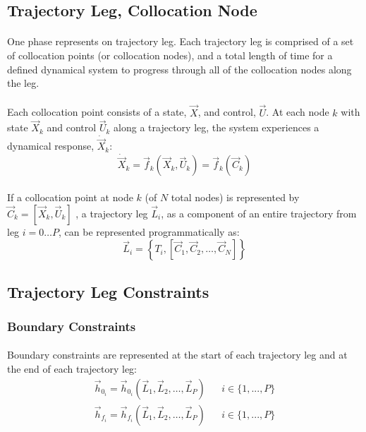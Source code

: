 \subsection{Trajectory Leg, Collocation Node}
\paragraph{}
One phase represents on trajectory leg. Each trajectory leg is comprised of a set of collocation points (or collocation nodes), and a total length of time for a defined dynamical system to progress through all of the collocation nodes along the leg. 
\paragraph{}
Each collocation point consists of a state, $\vec{X}$, and control, $\vec{U}$. At each node $k$ with state $\vec{X}_k$ and control $\vec{U}_k$ along a trajectory leg, the system experiences a dynamical response, $\dot{\vec{X}}_k$:
\begin{equation}
\dot{\vec{X}}_k = \vec{f}_k (\vec{X}_k, \vec{U}_k) = \vec{f}_k(\vec{C}_k)
\end{equation}
\paragraph{}
If a collocation point at node $k$ (of $N$ total nodes) is represented by $\vec{C}_k = [\vec{X}_k, \vec{U}_k]$ , a trajectory leg $\vec{L}_i$, as a component of an entire trajectory from leg $i=0 \dots P$, can be represented programmatically as:
\begin{equation}
\vec{L}_i = \left\{ T_i, \left[
\vec{C}_1, \vec{C}_2, \dots, \vec{C}_N
\right]
\right\}
\end{equation}
\subsection{Trajectory Leg Constraints}
\subsubsection{Boundary Constraints}
\paragraph{}
Boundary constraints are represented at the start of each trajectory leg and at the end of each trajectory leg:
\begin{align}
\vec{h}_{0_i} = \vec{h}_{0_i} (\vec{L}_1, \vec{L}_2, \dots, \vec{L}_P) &&
i \in \{ 1, ... , P \}
\end{align}
\begin{align}
\vec{h}_{f_i} = \vec{h}_{f_i} (\vec{L}_1, \vec{L}_2, \dots, \vec{L}_P) &&
i \in \{ 1, ... , P \}
\end{align}
